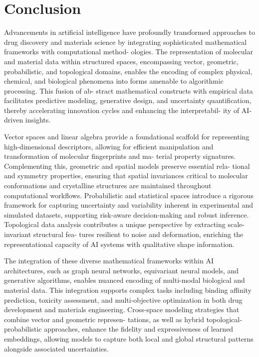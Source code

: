 \documentclass[
]{article}
\begin{document}
\hypertarget{conclusion}{%
\section{Conclusion}\label{conclusion}}

Advancements in artificial intelligence have profoundly transformed
approaches to drug discovery and materials science by integrating
sophisticated mathematical frameworks with computational method-
ologies. The representation of molecular and material data within
structured spaces, encompassing vector, geometric, probabilistic, and
topological domains, enables the encoding of complex physical, chemical,
and biological phenomena into forms amenable to algorithmic processing.
This fusion of ab- stract mathematical constructs with empirical data
facilitates predictive modeling, generative design, and uncertainty
quantification, thereby accelerating innovation cycles and enhancing the
interpretabil- ity of AI-driven insights.

Vector spaces and linear algebra provide a foundational scaffold for
representing high-dimensional descriptors, allowing for efficient
manipulation and transformation of molecular fingerprints and ma- terial
property signatures. Complementing this, geometric and spatial models
preserve essential rela- tional and symmetry properties, ensuring that
spatial invariances critical to molecular conformations and crystalline
structures are maintained throughout computational workflows.
Probabilistic and statistical spaces introduce a rigorous framework for
capturing uncertainty and variability inherent in experimental and
simulated datasets, supporting risk-aware decision-making and robust
inference. Topological data analysis contributes a unique perspective by
extracting scale-invariant structural fea- tures resilient to noise and
deformation, enriching the representational capacity of AI systems with
qualitative shape information.

The integration of these diverse mathematical frameworks within AI
architectures, such as graph neural networks, equivariant neural models,
and generative algorithms, enables nuanced encoding of multi-modal
biological and material data. This integration supports complex tasks
including binding affinity prediction, toxicity assessment, and
multi-objective optimization in both drug development and materials
engineering. Cross-space modeling strategies that combine vector and
geometric represen- tations, as well as hybrid topological-probabilistic
approaches, enhance the fidelity and expressiveness of learned
embeddings, allowing models to capture both local and global structural
patterns alongside associated uncertainties.
\end{document}
